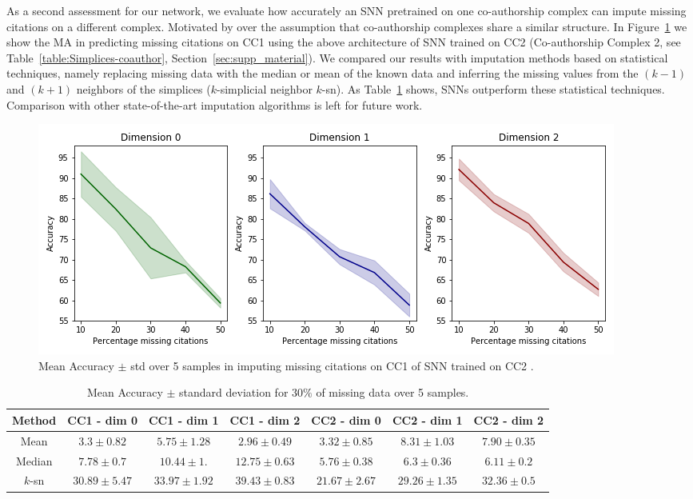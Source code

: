 As a second assessment for our network, we evaluate how accurately an SNN pretrained on one co-authorship complex can impute missing citations on a different complex. Motivated by over the assumption that co-authorship complexes share a similar structure. In Figure~\ref{fig:transfer-learning} we show the MA in predicting missing citations on CC1 using the above architecture of SNN trained on CC2 (Co-authorship Complex 2, see Table~\ref{table:Simplices-coauthor}, Section~\ref{sec:supp_material}).
We compared our results with imputation methods based on statistical techniques, namely replacing missing data with the median or mean of the known data and inferring the missing values from the $(k-1)$ and $(k+1)$ neighbors of the simplices ($k$-simplicial neighbor $k$-sn). As Table~\ref{table:comparison-SNN} shows, SNNs outperform these statistical techniques. Comparison with other state-of-the-art imputation algorithms is left for future work.
\begin{figure}[htbp]
  \centering
\includegraphics[scale=0.35]{./figures/accuracy_network1_pretrained.png}
  \caption{ Mean Accuracy $\pm$ std over 5 samples in imputing missing citations on CC1 of SNN trained on CC2 . } \label{fig:transfer-learning}
\end{figure}

\begin{table}[htbp]
  \centering
  \scriptsize{
  \begin{tabular}{c|cccccc}
    \cmidrule(r){1-7}
    Method   & CC1 - dim 0   & CC1 - dim 1   & CC1 - dim 2   & CC2 - dim 0  & CC2 - dim 1  & CC2 - dim 2 \\
    \midrule
    Mean & $3.3 \pm 0.82$ & $5.75\pm 1.28$  &$ 2.96\pm 0.49$  & $3.32 \pm 0.85$ & $8.31 \pm 1.03$  & $7.90\pm 0.35$\\
    Median & $7.78 \pm 0.7$   & $10.44 \pm 1.$ &$ 12.75 \pm 0.63 $ & $5.76 \pm 0.38 $&$ 6.3\pm 0.36  $&$ 6.11\pm 0.2$\\
    $k$-sn & $30.89\pm 5.47 $& $33.97 \pm 1.92$ & $39.43 \pm 0.83  $& $21.67 \pm 2.67 $&$ 29.26\pm 1.35$   &$ 32.36 \pm 0.5 $\\
    \bottomrule
  \end{tabular}}
   \vspace{2pt}
  \caption{%
 Mean Accuracy $\pm$ standard deviation for $30\%$ of missing data over 5 samples. 
  }\label{table:comparison-SNN}
\end{table}%

